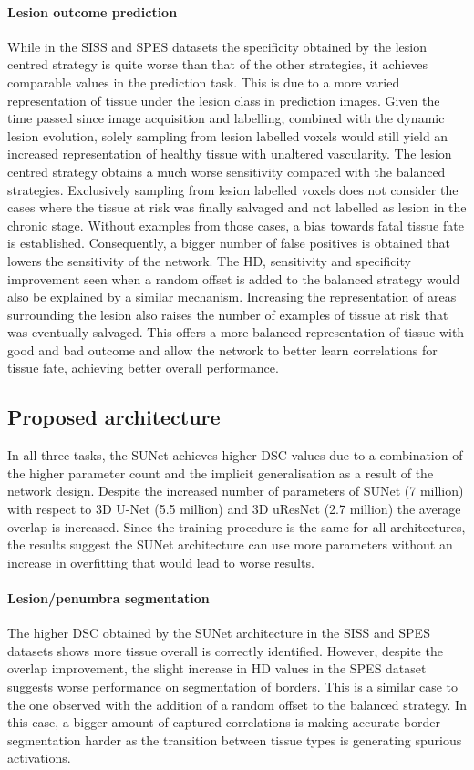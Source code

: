 \documentclass[letterpaper,final,authoryear,3p,times,twocolumn]{elsarticle}
\begin{document}
\paragraph{Lesion outcome prediction} 
While in the SISS and SPES datasets the specificity obtained by the lesion centred strategy is quite worse than that of the other strategies, it achieves comparable values in the prediction task. This is due to a more varied representation of tissue under the lesion class in prediction images. Given the time passed since image acquisition and labelling, combined with the dynamic lesion evolution, solely sampling from lesion labelled voxels would still yield an increased representation of healthy tissue with unaltered vascularity. The lesion centred strategy obtains a much worse sensitivity compared with the balanced strategies. Exclusively sampling from lesion labelled voxels does not consider the cases where the tissue at risk was finally salvaged and not labelled as lesion in the chronic stage. Without examples from those cases, a bias towards fatal tissue fate is established. Consequently, a bigger number of false positives is obtained that lowers the sensitivity of the network. The HD, sensitivity and specificity improvement seen when a random offset is added to the balanced strategy would also be explained by a similar mechanism. Increasing the representation of areas surrounding the lesion also raises the number of examples of tissue at risk that was eventually salvaged. This offers a more balanced representation of tissue with good and bad outcome and allow the network to better learn correlations for tissue fate, achieving better overall performance.

\subsection{Proposed architecture} %
In all three tasks, the SUNet achieves higher DSC values due to a combination of the higher parameter count and the implicit generalisation as a result of the network design. 
Despite the increased number of parameters of SUNet (7 million) with respect to 3D U-Net (5.5 million) and 3D uResNet (2.7 million) the average overlap is increased. Since the training procedure is the same for all architectures, the results suggest the SUNet architecture can use more parameters without an increase in overfitting that would lead to worse results.

\paragraph{Lesion/penumbra segmentation} 
The higher DSC obtained by the SUNet architecture in the SISS and SPES datasets shows more tissue overall is correctly identified. However, despite the overlap improvement, the slight increase in HD values in the SPES dataset suggests worse performance on segmentation of borders. This is a similar case to the one observed with the addition of a random offset to the balanced strategy. In this case, a bigger amount of captured correlations is making accurate border segmentation harder as the transition between tissue types is generating spurious activations.
\end{document}

